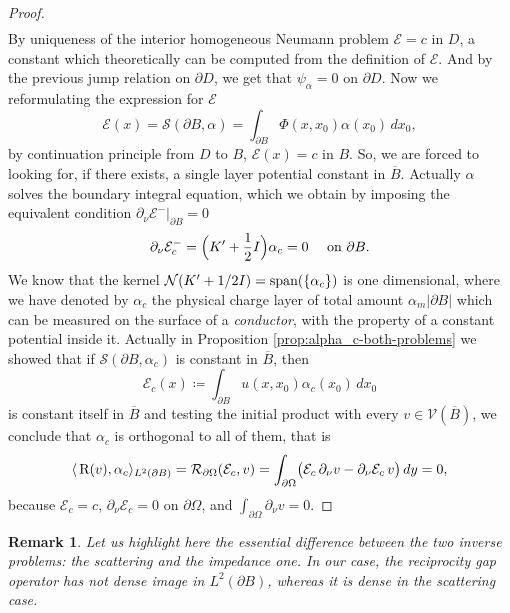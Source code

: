 \documentclass[10pt, a4paper, twoside, openright]{book}
\theoremstyle{definition}
\theoremstyle{plain}
\theoremstyle{plain}
\theoremstyle{plain}
\theoremstyle{plain}
\newtheorem{remark}[subsection]{Remark}
\theoremstyle{plain}
\theoremstyle{plain}
\theoremstyle{plain}
\theoremstyle{plain}
\begin{document}
\begin{proof}
\begin{align}
 \end{align}
 By uniqueness of the interior homogeneous Neumann problem $\mathcal{E} = c$ in $D$, a constant which theoretically can be computed 
 from the definition of $\mathcal{E}$. And by the previous jump relation on $\partial D$, 
 we get that $\psi_\alpha=0$ on $\partial D$.
 Now we reformulating the expression for $\mathcal{E}$
 \begin{equation}
  \mathcal{E}(x)= \mathcal{S}(\partial B, \alpha) = \int_{\partial B}\Phi(x,x_0)\alpha(x_0)\, dx_0,
 \end{equation}
 by continuation principle from $D$ to $B$, $\mathcal{E}(x)=c$ in $B$. So, we are forced to looking for, if there exists, a single layer potential constant in $\overline{B}$. 
 Actually $\alpha$ solves the boundary integral equation, which we obtain by imposing the equivalent condition $\partial_\nu\mathcal{E}^-|_{\partial B}=0$
 \begin{equation}
  \partial_\nu\mathcal{E}_{c}^-=\Bigl(K'+\dfrac{1}{2}I\Bigr)\alpha_{c}= 0\quad\textup{ on }\partial B.
 \end{equation}
 We know that the kernel $\mathcal{N}(K' + 1/2 I)=\textup{span}(\{\alpha_{c}\})$ is one dimensional, where we have denoted by $\alpha_{c}$ the physical charge layer of total amount $\alpha_m |\partial B|$  which can be measured
 on the surface of a \emph{conductor}, with the property of a constant potential inside it.
Actually in Proposition \ref{prop:alpha_c-both-problems} we showed that if $\mathcal{S}(\partial B, \alpha_{c})$ is constant in $\overline{B}$, then
\begin{equation}
 \mathcal{E}_{c}(x)\coloneqq\int_{\partial B}u(x,x_0)\alpha_{c}(x_0)\,dx_0\label{eq:definition-E-pc}
\end{equation}
is constant itself in $\overline{B}$ and testing the initial product with every $v\in\mathcal{V}(\overline{B})$, we conclude that $\alpha_{c}$ is orthogonal to all of them, that is
\begin{equation}
 \langle \, \textup{R}(v) ,\alpha_{c}\rangle_{L^2(\partial B)}=\mathcal{R}_{\partial \Omega}(\mathcal{E}_{c}, v)=\int_{\partial\Omega}\bigl(\mathcal{E}_{c}\,\partial_\nu v - \partial_\nu\mathcal{E}_{c}\, v\bigr)\,dy=0,
\end{equation}
because $\mathcal{E}_{c}=c$, $\partial_\nu\mathcal{E}_{c}=0$ on $\partial\Omega$, and $\int_{\partial\Omega}\partial_\nu v=0$.
\end{proof}
\begin{remark}
Let us highlight here the essential difference between the two inverse problems: the scattering and the impedance one. 
In our case, the reciprocity gap operator has not dense image in $L^2(\partial B)$, 
whereas it is dense in the scattering case.
\end{remark}
\end{document}
